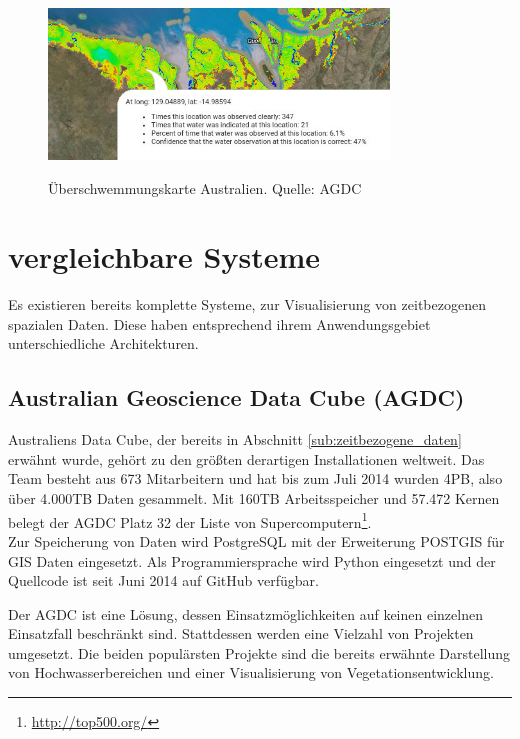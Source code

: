 \documentclass[10pt,conference,compsocconf]{IEEEtran}
\begin{document}
\begin{figure}[H]
  \centering
  	\includegraphics[height=114pt]{img/agcd_flood}\\
  \caption[]{Überschwemmungskarte Australien. Quelle: AGDC\footnotemark}
  \label{img:agcd_flood}
\end{figure}


\section{vergleichbare Systeme}
Es existieren bereits komplette Systeme, zur Visualisierung von zeitbezogenen spazialen Daten. Diese haben entsprechend ihrem Anwendungsgebiet unterschiedliche Architekturen.

\subsection{Australian Geoscience Data Cube (AGDC)}
Australiens Data Cube, der bereits in Abschnitt \ref{sub:zeitbezogene_daten} erwähnt wurde, gehört zu den größten derartigen Installationen weltweit. Das Team besteht aus 673 Mitarbeitern und hat bis zum Juli 2014 wurden 4PB, also über 4.000TB Daten gesammelt\cite{agdc}. Mit 160TB Arbeitsspeicher und 57.472 Kernen belegt der AGDC Platz 32 der Liste von Supercomputern\footnote{\url{http://top500.org/}}.\\
Zur Speicherung von Daten wird PostgreSQL mit der Erweiterung POSTGIS für GIS Daten eingesetzt. Als Programmiersprache wird Python eingesetzt und der Quellcode ist seit Juni 2014 auf GitHub verfügbar.\par

Der AGDC ist eine Lösung, dessen Einsatzmöglichkeiten auf keinen einzelnen Einsatzfall beschränkt sind. Stattdessen werden eine Vielzahl von Projekten umgesetzt. Die beiden populärsten Projekte sind die bereits erwähnte Darstellung von Hochwasserbereichen und einer Visualisierung von Vegetationsentwicklung\cite{agdc2}.
\end{document}
